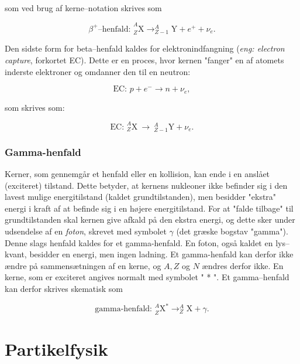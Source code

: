  som ved brug af kerne--notation skrives som
 
\begin{equation}
\text{$\beta^+$--henfald: } ^A_Z\text{X} \rightarrow ^A_{Z-1}\text{Y} + e^+ + \nu_e.
\end{equation}

Den sidste form for beta--henfald kaldes for elektronindfangning (\emph{eng: electron capture}, forkortet EC). Dette er en proces, hvor kernen "fanger" en af atomets inderste elektroner og omdanner den til en neutron:

\begin{equation}
\text{EC: } p + e^- \rightarrow n + \nu_e,
\end{equation}

som skrives som:

\begin{equation}
\text{EC: } ^A_Z\text{X}~\rightarrow~^A_{Z-1}\text{Y} + \nu_e.
\end{equation}

\subsubsection{Gamma-henfald}
Kerner, som gennemgår et henfald eller en kollision, kan ende i en anslået (exciteret) tilstand. Dette betyder, at kernens nukleoner ikke befinder sig i den lavest mulige energitilstand (kaldet grundtilstanden), men besidder "ekstra" energi i kraft af at befinde sig i en højere energitilstand. For at "falde tilbage"  til grundtilstanden skal kernen give afkald på den ekstra energi, og dette sker under udsendelse af en \emph{foton}, skrevet med symbolet $\gamma$ (det græske bogstav "gamma"). Denne slags henfald kaldes for et gamma-henfald. En foton, også kaldet en lys--kvant, besidder en energi, men ingen ladning. Et gamma-henfald kan derfor ikke ændre på sammensætningen af en kerne, og $A,Z$ og $N$ ændres derfor ikke. En kerne, som er exciteret angives normalt med symbolet " * ". Et gamma--henfald kan derfor skrives skematisk som

\begin{equation}
\text{gamma-henfald: } ^A_Z\text{X}^* \rightarrow ^A_Z\text{X} + \gamma.
\end{equation}
\newpage

\section{Partikelfysik}
\label{cha:partikel}


